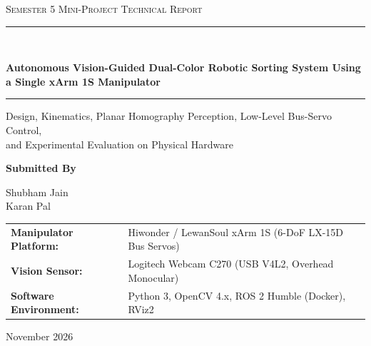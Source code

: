 \documentclass[11pt,a4paper]{article}
\begin{document}
\begin{titlepage}
  \centering
  \vspace*{1.2cm}
  {\large\textsc{Semester 5 Mini-Project Technical Report}\par}
  \vspace{0.8cm}
  \rule{\linewidth}{0.8pt}\\[0.5cm]
  {\LARGE\bfseries Autonomous Vision-Guided Dual-Color Robotic Sorting System Using a Single xArm 1S Manipulator\par}
  \vspace{0.4cm}
  \rule{\linewidth}{0.8pt}

  \vspace{1.2cm}
  {\large
  Design, Kinematics, Planar Homography Perception, Low-Level Bus-Servo Control,\\
  and Experimental Evaluation on Physical Hardware\par}

  \vspace{2.2cm}
  \textbf{Submitted By}\\[0.5cm]
  {\large
  Shubham Jain\\[0.2cm]
  Karan Pal\par}

  \vspace{2.5cm}
  \begin{tabular}{@{}ll@{}}
    \textbf{Manipulator Platform:} & Hiwonder / LewanSoul xArm 1S (6-DoF LX-15D Bus Servos) \\
    \textbf{Vision Sensor:}        & Logitech Webcam C270 (USB V4L2, Overhead Monocular) \\
    \textbf{Software Environment:} & Python 3, OpenCV 4.x, ROS 2 Humble (Docker), RViz2 \\
  \end{tabular}

  \vfill
  {\normalsize November 2026\par}
\end{titlepage}
\end{document}
